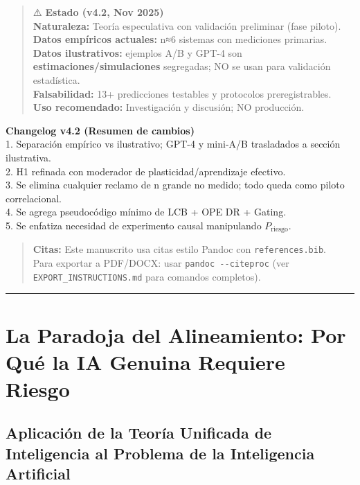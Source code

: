 \begin{quote}
⚠️ \textbf{Estado (v4.2, Nov 2025)}\\
\textbf{Naturaleza:} Teoría especulativa con validación preliminar (fase
piloto).\\
\textbf{Datos empíricos actuales:} n≈6 sistemas con mediciones
primarias.\\
\textbf{Datos ilustrativos:} ejemplos A/B y GPT-4 son
\textbf{estimaciones/simulaciones} segregadas; NO se usan para
validación estadística.\\
\textbf{Falsabilidad:} 13+ predicciones testables y protocolos
preregistrables.\\
\textbf{Uso recomendado:} Investigación y discusión; NO producción.
\end{quote}

\textbf{Changelog v4.2 (Resumen de cambios)}\\
1. Separación empírico vs ilustrativo; GPT-4 y mini-A/B trasladados a
sección ilustrativa.\\
2. H1 refinada con moderador de plasticidad/aprendizaje efectivo.\\
3. Se elimina cualquier reclamo de n grande no medido; todo queda como
piloto correlacional.\\
4. Se agrega pseudocódigo mínimo de LCB + OPE DR + Gating.\\
5. Se enfatiza necesidad de experimento causal manipulando
\(P_{\text{riesgo}}\).

\begin{quote}
\textbf{Citas:} Este manuscrito usa citas estilo Pandoc con
\texttt{references.bib}.\\
Para exportar a PDF/DOCX: usar \texttt{pandoc\ -\/-citeproc} (ver
\texttt{EXPORT\_INSTRUCTIONS.md} para comandos completos).
\end{quote}

\begin{center}\rule{0.5\linewidth}{0.5pt}\end{center}

\section{La Paradoja del Alineamiento: Por Qué la IA Genuina Requiere
Riesgo}\label{la-paradoja-del-alineamiento-por-quuxe9-la-ia-genuina-requiere-riesgo}

\subsection{Aplicación de la Teoría Unificada de Inteligencia al
Problema de la Inteligencia
Artificial}\label{aplicaciuxf3n-de-la-teoruxeda-unificada-de-inteligencia-al-problema-de-la-inteligencia-artificial}

